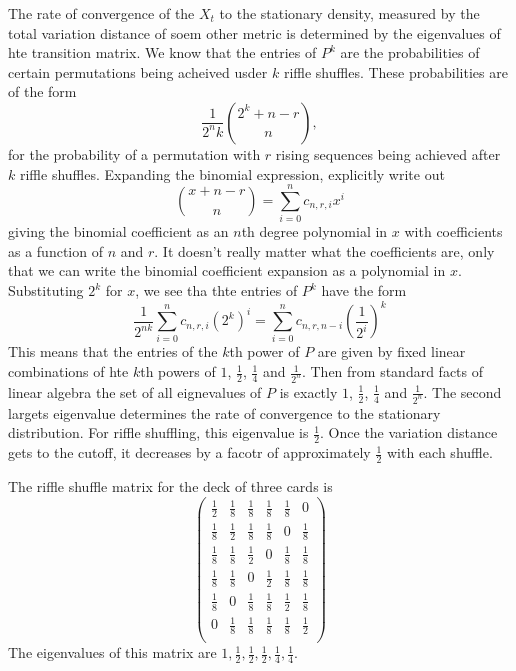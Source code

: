 \documentclass[12pt]{article}
\begin{document}
The rate of convergence of the \( X_t \) to the stationary density,
measured by the total variation distance of soem other metric is
determined by the eigenvalues of hte transition matrix.  We know that
the entries of \( P^k \) are the probabilities of certain permutations
being acheived usder \( k \) riffle shuffles.  These probabilities are
of the form
\[
    \frac{1}{2^nk} \binom{2^k +n - r}{n},
\] for the probability of a permutation with \( r \) rising sequences
being achieved after \( k \) riffle shuffles.  Expanding the binomial
expression, explicitly write out
\[
    \binom{x + n - r}{n} = \sum\limits_{i=0}^n c_{n,r,i} x^i
\] giving the binomial coefficient as an \( n \)th degree polynomial in \(
x \) with coefficients as a function of \( n \) and \( r \).  It doesn't
really matter what the coefficients are, only that we can write the
binomial coefficient expansion as a polynomial in \( x \).  Substituting
\( 2^k \) for \( x \), we see tha thte entries of \( P^k \) have the
form
\[
    \frac{1}{2^{nk}} \sum\limits_{i=0}^n c_{n,r,i} \left( 2^k \right)^i
    = \sum\limits_{i=0}^n c_{n,r,n-i} \left( \frac{1}{2^i} \right)^k
\] This means that the entries of the \( k \)th power of \( P \) are
given by fixed linear combinations of hte \( k \)th powers of \( 1 \), \(
\frac{1}{2} \), \( \frac{1}{4} \) and \( \frac{1}{2^n} \).  Then from
standard facts of linear algebra the set of all eignevalues of \( P \)
is exactly \( 1 \), \( \frac{1}{2} \), \( \frac{1}{4} \) and \( \frac{1}
{2^n} \).  The second largets eigenvalue determines the rate of
convergence to the stationary distribution. For riffle shuffling, this
eigenvalue is \( \frac{1}{2} \).  Once the variation distance gets to
the cutoff, it decreases by a facotr of approximately \( \frac{1}{2} \)
with each shuffle.

\begin{example}
    The riffle shuffle matrix for the deck of three cards is
\[
    \begin{pmatrix}
        \frac{1}{2}     & \frac{1}{8}   & \frac{1}{8}   & \frac{1}{8}
        & \frac{1}{8}   & 0 \\
        \frac{1}{8}     & \frac{1}{2}   & \frac{1}{8}   & \frac{1}{8}
        & 0     & \frac{1}{8} \\
        \frac{1}{8}     & \frac{1}{8}   & \frac{1}{2}   & 0     & \frac{1}
        {8}     & \frac{1}{8} \\
        \frac{1}{8}     & \frac{1}{8}   & 0     & \frac{1}{2}   &
        \frac{1}{8}   & \frac{1}{8} \\
        \frac{1}{8}     & 0     & \frac{1}{8}   & \frac{1}{8}   & \frac{1}
        {2}     & \frac{1}{8} \\
        0       & \frac{1}{8}   & \frac{1}{8}   & \frac{1}{8}   & \frac{1}
        {8}     & \frac{1}{2} \\
    \end{pmatrix}
\]
    The eigenvalues of this matrix are \( 1, \frac{1}{2}, \frac{1}{2},
    \frac{1}{2}, \frac{1}{4}, \frac{1}{4} \).
\end{example}
\end{document}

